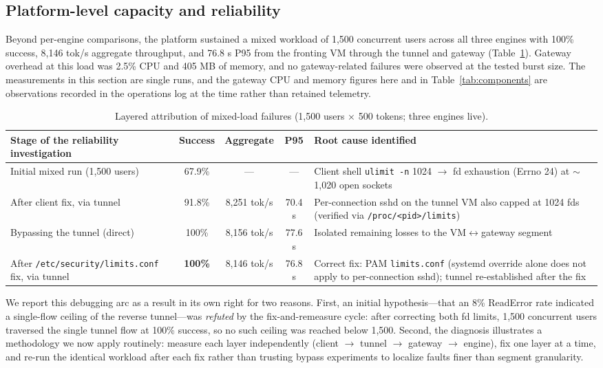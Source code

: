 \documentclass[11pt]{article}
\newcommand{\tps}{tok/s\xspace}
\begin{document}
\subsection{Platform-level capacity and reliability}
\label{sec:reliability}

Beyond per-engine comparisons, the platform sustained a mixed workload of 1,500 concurrent users across all three engines with 100\% success, 8,146 \tps{} aggregate throughput, and 76.8 s P95 from the fronting VM through the tunnel and gateway (Table~\ref{tab:reliability}). Gateway overhead at this load was 2.5\% CPU and 405 MB of memory, and no gateway-related failures were observed at the tested burst size. The measurements in this section are single runs, and the gateway CPU and memory figures here and in Table~\ref{tab:components} are observations recorded in the operations log at the time rather than retained telemetry.

\begin{table}[t]
\centering
\footnotesize
\begin{tabularx}{\textwidth}{>{\raggedright\arraybackslash}Xccc>{\raggedright\arraybackslash}p{4.9cm}}
\toprule
\textbf{Stage of the reliability investigation} & \textbf{Success} & \textbf{Aggregate} & \textbf{P95} & \textbf{Root cause identified} \\
\midrule
Initial mixed run (1,500 users) & 67.9\% & --- & --- & Client shell \texttt{ulimit -n} 1024 $\rightarrow$ fd exhaustion (Errno 24) at $\sim$1,020 open sockets \\
After client fix, via tunnel & 91.8\% & 8,251 \tps & 70.4 s & Per-connection sshd on the tunnel VM also capped at 1024 fds (verified via \texttt{/proc/<pid>/limits}) \\
Bypassing the tunnel (direct) & 100\% & 8,156 \tps & 77.6 s & Isolated remaining losses to the VM$\leftrightarrow$gateway segment \\
After \texttt{/etc/security/limits.conf} fix, via tunnel & \textbf{100\%} & 8,146 \tps & 76.8 s & Correct fix: PAM \texttt{limits.conf} (systemd override alone does not apply to per-connection sshd); tunnel re-established after the fix \\
\bottomrule
\end{tabularx}
\caption{Layered attribution of mixed-load failures (1,500 users $\times$ 500 tokens; three engines live).}
\label{tab:reliability}
\end{table}

We report this debugging arc as a result in its own right for two reasons. First, an initial hypothesis---that an 8\% ReadError rate indicated a single-flow ceiling of the reverse tunnel---was \emph{refuted} by the fix-and-remeasure cycle: after correcting both fd limits, 1,500 concurrent users traversed the single tunnel flow at 100\% success, so no such ceiling was reached below 1,500. Second, the diagnosis illustrates a methodology we now apply routinely: measure each layer independently (client $\rightarrow$ tunnel $\rightarrow$ gateway $\rightarrow$ engine), fix one layer at a time, and re-run the identical workload after each fix rather than trusting bypass experiments to localize faults finer than segment granularity.
\end{document}
